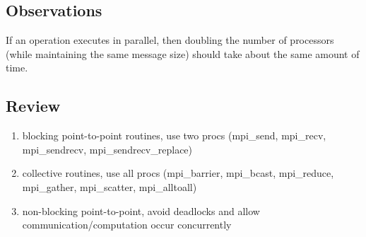 \documentclass[10pt]{article}
\newenvironment{menumerate}
{
  \begin{enumerate}
  \setlength{\itemsep}{1pt}
  \setlength{\parskip}{0pt}
  \setlength{\parsep}{0pt}}{\end{enumerate}
}
\begin{document}
\subsection*{Observations}
If an operation executes in parallel, then doubling the number of processors (while maintaining the same message size) should take about the same amount of time.

\subsection*{Review}
\begin{menumerate}
  \item blocking point-to-point routines, use two procs (mpi\_send, mpi\_recv, mpi\_sendrecv, mpi\_sendrecv\_replace)
  \item collective routines, use all procs (mpi\_barrier, mpi\_bcast, mpi\_reduce, mpi\_gather, mpi\_scatter, mpi\_alltoall)
  \item non-blocking point-to-point, avoid deadlocks and allow communication/computation occur concurrently
\end{menumerate}
\end{document}
